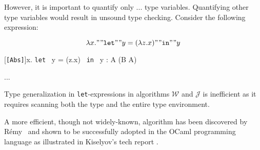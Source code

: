 However, it is important to quantify only ... type variables. Quantifying other type variables would result in unsound type checking. Consider the following expression:

$$
\lambda x." "\texttt{let}" "y = (\lambda z.x)" "\texttt{in}" "y
$$

\begin{prooftree*}



  [\texttt{[Abs]}]{\Gamma \vdash \lambda x. \texttt{let } y = (\lambda z.x) \texttt{ in } y : A \to (B \to A)}
\end{prooftree*}

...

Type generalization in \texttt{let}-expressions in algorithms $\mathcal{W}$ and $\mathcal{J}$ is inefficient as it requires scanning both the type and the entire type environment.

A more efficient, though not widely-known, algorithm has been discovered by R\'emy~\cite{Remy1992_SortedEqTheoryTypes} and shown to be successfully adopted in the OCaml programming language as illustrated in Kiselyov's tech report \cite{Kiselyov2022_OCamplTypeChecker}.


